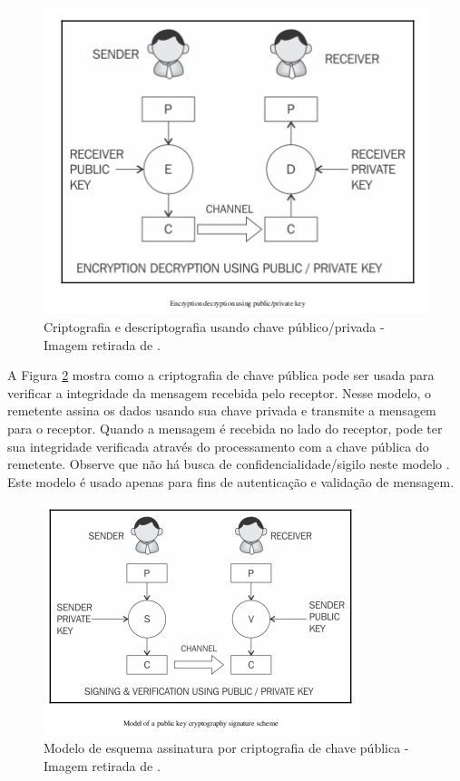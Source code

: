                     \begin{figure}[h]
                         \centering
                         \includegraphics[scale=0.6]{figuras/capitulo_2/public_private_encryption.png}
                         \caption{Criptografia e descriptografia usando chave público/privada - Imagem retirada de \cite{mastering_blockchain}.}
                         \label{fig:public_private_encryption}
                    \end{figure}
                    
                    
                A Figura \ref{fig:public_private_signature} mostra como a criptografia de chave pública pode ser usada para verificar a integridade da mensagem recebida pelo receptor. Nesse modelo, o remetente assina os dados usando sua chave privada e transmite a mensagem para o receptor. Quando a mensagem é recebida no lado do receptor, pode ter sua integridade verificada através do processamento com a chave pública do remetente. Observe que não há busca de confidencialidade/sigilo neste modelo \cite{mastering_blockchain}. Este modelo é usado apenas para fins de autenticação e validação de mensagem.
                    
                    \begin{figure}[h]
                         \centering
                         \includegraphics[scale=0.7]{figuras/capitulo_2/public_private_signature.png}
                         \caption{Modelo de esquema assinatura por criptografia de chave pública - Imagem retirada de \cite{mastering_blockchain}.}
                         \label{fig:public_private_signature}
                    \end{figure}
                    
